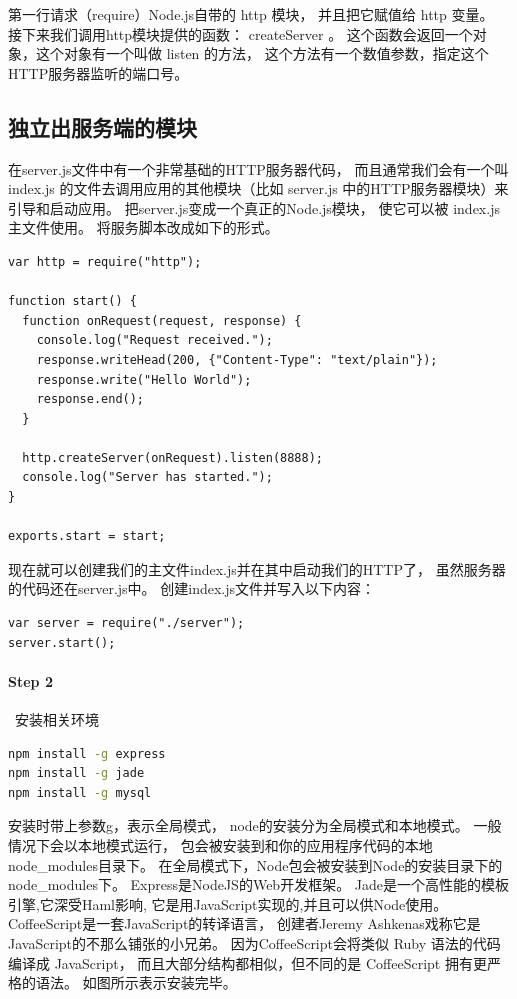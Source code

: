 \documentclass{book}
\begin{document}
第一行请求（require）Node.js自带的 http 模块，
并且把它赋值给 http 变量。
接下来我们调用http模块提供的函数： createServer 。
这个函数会返回一个对象，这个对象有一个叫做 listen 的方法，
这个方法有一个数值参数，指定这个HTTP服务器监听的端口号。

\subsection{独立出服务端的模块}

在server.js文件中有一个非常基础的HTTP服务器代码，
而且通常我们会有一个叫 index.js 
的文件去调用应用的其他模块（比如 server.js 中的HTTP服务器模块）来引导和启动应用。
把server.js变成一个真正的Node.js模块，
使它可以被 index.js 主文件使用。
将服务脚本改成如下的形式。

\begin{lstlisting}[language=VBScript]
var http = require("http");

function start() {
  function onRequest(request, response) {
    console.log("Request received.");
    response.writeHead(200, {"Content-Type": "text/plain"});
    response.write("Hello World");
    response.end();
  }

  http.createServer(onRequest).listen(8888);
  console.log("Server has started.");
}

exports.start = start;
\end{lstlisting}

现在就可以创建我们的主文件index.js并在其中启动我们的HTTP了，
虽然服务器的代码还在server.js中。
创建index.js文件并写入以下内容：

\begin{lstlisting}[language=VBScript]
var server = require("./server");
server.start();
\end{lstlisting}

\paragraph{Step 2}~安装相关环境

\begin{lstlisting}[language=Bash]
npm install -g express  
npm install -g jade
npm install -g mysql
\end{lstlisting}

安装时带上参数g，表示全局模式，
node的安装分为全局模式和本地模式。
一般情况下会以本地模式运行，
包会被安装到和你的应用程序代码的本地node\_modules目录下。
在全局模式下，Node包会被安装到Node的安装目录下的node\_modules下。
Express是NodeJS的Web开发框架。
Jade是一个高性能的模板引擎,它深受Haml影响,
它是用JavaScript实现的,并且可以供Node使用。
CoffeeScript是一套JavaScript的转译语言，
创建者Jeremy Ashkenas戏称它是JavaScript的不那么铺张的小兄弟。
因为CoffeeScript会将类似 Ruby 语法的代码编译成 JavaScript，
而且大部分结构都相似，但不同的是 CoffeeScript 拥有更严格的语法。
如图所示表示安装完毕。
\end{document}
